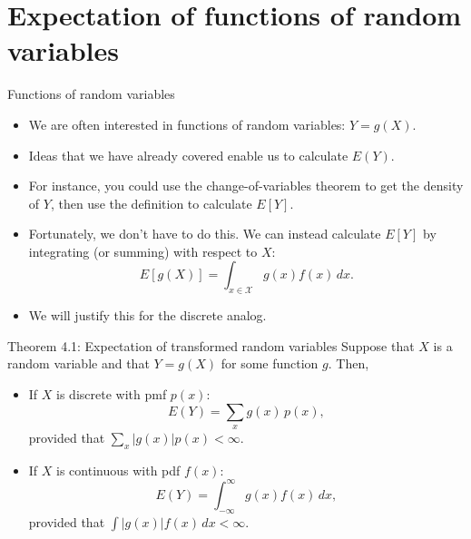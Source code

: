 \section{Expectation of functions of random variables}

\begin{frame}[allowframebreaks]{Functions of random variables}
  \begin{itemize}
    \item We are often interested in functions of random variables: $Y = g(X)$.
    \item Ideas that we have already covered enable us to calculate $E(Y)$.
    \item For instance, you could use the change-of-variables theorem to get the density of $Y$, then use the definition to calculate $E[Y]$.
    \item Fortunately, we don't have to do this. We can instead calculate $E[Y]$ by integrating (or summing) with respect to $X$:
    $$
    E[g(X)] = \int_{x \in \mathcal{X}} g(x)f(x) \, dx.
    $$
    \item We will justify this for the discrete analog.
  \end{itemize}
  
  \framebreak
  
  \begin{block}{Theorem 4.1: Expectation of transformed random variables}
    Suppose that $X$ is a random variable and that $Y = g(X)$ for some function $g$. Then,
    \begin{itemize}
      \item If $X$ is discrete with pmf $p(x)$:
      $$
      E(Y) = \sum_x g(x)\, p(x),
      $$
      provided that $\sum_x |g(x)| p(x) < \infty$.
      \item If $X$ is continuous with pdf $f(x)$:
      $$
      E(Y) = \int_{-\infty}^\infty g(x) f(x)\, dx,
      $$
      provided that $\int |g(x)| f(x) \, dx < \infty$.
    \end{itemize}
  \end{block}
  
  \end{frame}
  
